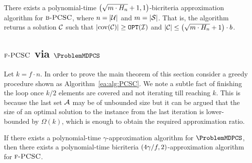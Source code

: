 \begin{theorem} \label{ea:thm:BPCSC}
    There exists a polynomial-time $\mathopen{}\left( \sqrt{m\cdot H_n}+1, 1 \right)$-bicriteria approximation algorithm for $\textup{\textsc{b-PCSC}}$, where $n=\mathopen{}\left| \mathcal{U} \right|$ and $m=\mathopen{}\left| \mathcal{S} \right|$. That is, the algorithm returns a solution $\mathcal{C}$ such that $\mathopen{}\left| \operatorname{cov}\mathopen{}\left( \mathcal{C} \right) \right|\geq \texttt{OPT}\mathopen{}\left( \mathcal{I} \right)$ and $\mathopen{}\left| \mathcal{C} \right|\leq \mathopen{}\left( \sqrt{m\cdot H_n}+1 \right)\cdot b$.
\end{theorem}

\subsection{$\textup{\textsc{f-PCSC}}$ via $\ProblemMDPCS$}\label{ea:subsection:PCSC}
Let $k=f\cdot n$.
In order to prove the main theorem of this section consider a greedy procedure shown as Algorithm~\ref{ea:alg:PCSC}.
We note a subtle fact of finishing the loop once $k/2$ elements are covered and not iterating till reaching $k$.
This is because the last set $\mathcal{A}$ may be of unbounded size but it can be argued that the size of an optimal solution to the instance from the last iteration is lower-bounded by $\Omega(k)$, which is enough to obtain the required approximation ratio.

\begin{theorem} \label{ea:thm:MDPCStoPCSC}
    If there exists a polynomial-time $\gamma$-approximation algorithm for $\ProblemMDPCS$, then there exists a polynomial-time bicriteria $\mathopen{}\left( 4\gamma/f, 2 \right)$-approximation algorithm for $\textup{\textsc{f-PCSC}}$.
\end{theorem}

